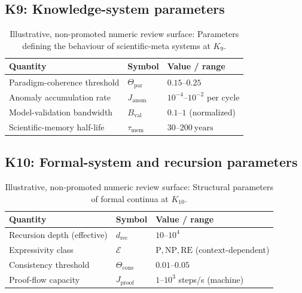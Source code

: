 
\subsection*{K9: Knowledge-system parameters}

\begin{table}[h]
  \centering
  \caption{Illustrative, non-promoted numeric review surface: Parameters defining the behaviour of scientific-meta systems at \(K_9\).}
  \label{tab:k9-knowledge-parameters}
  \begin{tabular}{lll}
    \hline
    Quantity & Symbol & Value / range \\
    \hline
    Paradigm-coherence threshold & \(\Theta_{\mathrm{par}}\)
        & \(0.15\text{–}0.25\) \\
    Anomaly accumulation rate & \(J_\mathrm{anom}\)
        & \(10^{-4}\text{–}10^{-2}\) per cycle \\
    Model-validation bandwidth & \(B_\mathrm{val}\)
        & \(0.1\text{–}1\) (normalized) \\
    Scientific-memory half-life & \(\tau_\mathrm{mem}\)
        & \(30\text{–}200~\mathrm{years}\) \\
    \hline
  \end{tabular}
\end{table}


\subsection*{K10: Formal-system and recursion parameters}

\begin{table}[h]
  \centering
  \caption{Illustrative, non-promoted numeric review surface: Structural parameters of formal continua at \(K_{10}\).}
  \label{tab:k10-formal-parameters}
  \begin{tabular}{lll}
    \hline
    Quantity & Symbol & Value / range \\
    \hline
    Recursion depth (effective) & \(d_\mathrm{rec}\)
        & \(10\text{–}10^4\) \\
    Expressivity class & \(\mathcal{E}\)
        & \(\mathrm{P}, \mathrm{NP}, \mathrm{RE}\) (context-dependent) \\
    Consistency threshold & \(\Theta_\mathrm{cons}\)
        & \(0.01\text{–}0.05\) \\
    Proof-flow capacity & \(J_\mathrm{proof}\)
        & \(1\text{–}10^3\) steps/s (machine) \\
    \hline
  \end{tabular}
\end{table}

